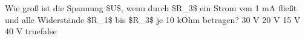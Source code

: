     {Wie groß ist die Spannung \$U\$, wenn durch \$R\_3\$ ein Strom von 1 mA fließt und alle Widerstände \$R\_1\$ bis \$R\_3\$ je 10 kOhm betragen? }
    {30 V}
    {20 V}
    {15 V}
    {40 V}
    {true}{false}